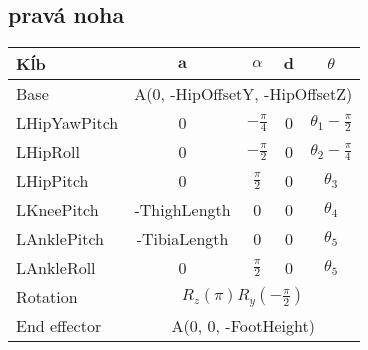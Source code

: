 \subsection{pravá noha}
\begin{center}
	\begin{tabular}{|l|c|c|c|c|}
	\hline
	\textbf{Kĺb} & $\textbf{a}$ & $\mathbb{\alpha}$ & $\textbf{d}$ & $\theta$ \\
	\hline
	Base & \multicolumn{4}{|c|}{A(0, -HipOffsetY, -HipOffsetZ)} \\
	\hline
	LHipYawPitch & 0 & $-\frac{\pi}{4}$ & 0 & $\theta_1 - \frac{\pi}{2}$ \\
	\hline
	LHipRoll & 0 & $-\frac{\pi}{2}$ & 0 &  $\theta_2 - \frac{\pi}{4}$ \\
	\hline
	LHipPitch & 0 & $\frac{\pi}{2}$ & 0 & $\theta_3$ \\
	\hline
	LKneePitch & -ThighLength & 0 & 0 & $\theta_4$ \\
	\hline 
	LAnklePitch & -TibiaLength & 0 & 0 & $\theta_5$ \\
	\hline
	LAnkleRoll & 0 & $\frac{\pi}{2}$ & 0 & $\theta_5$ \\
	\hline
	Rotation & \multicolumn{4}{|c|}{$R_z\left(\pi\right)R_y\left(-\frac{\pi}{2}\right)$} \\
	\hline
	End effector & \multicolumn{4}{|c|}{A(0, 0, -FootHeight)} \\
	\hline
	\end{tabular}
\end{center}